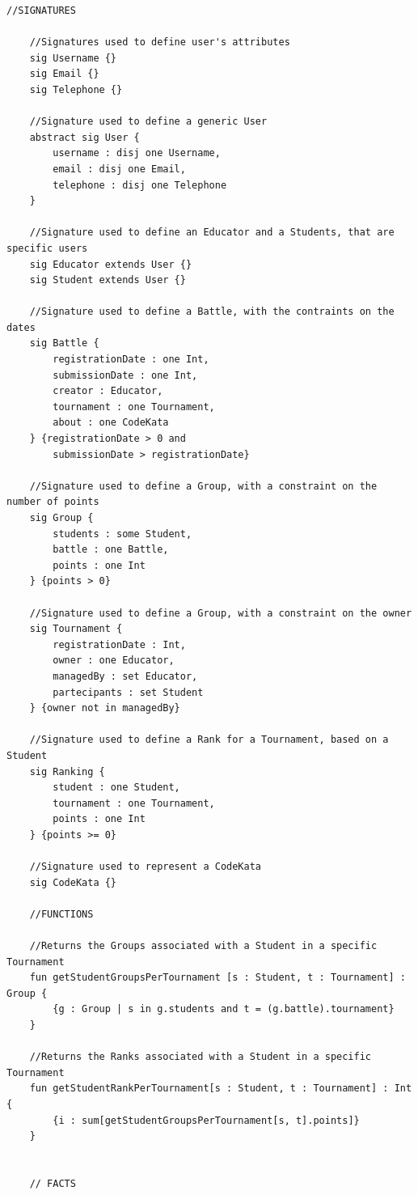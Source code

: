 \documentclass[12pt, a4paper]{report}
\begin{document}
\begin{lstlisting}[language=alloy]
    //SIGNATURES

    //Signatures used to define user's attributes
    sig Username {}
    sig Email {}
    sig Telephone {}
    
    //Signature used to define a generic User
    abstract sig User {
        username : disj one Username,
        email : disj one Email,
        telephone : disj one Telephone
    }
    
    //Signature used to define an Educator and a Students, that are specific users
    sig Educator extends User {}
    sig Student extends User {}
    
    //Signature used to define a Battle, with the contraints on the dates
    sig Battle {
        registrationDate : one Int,
        submissionDate : one Int,
        creator : Educator,
        tournament : one Tournament,
        about : one CodeKata
    } {registrationDate > 0 and 
        submissionDate > registrationDate}
    
    //Signature used to define a Group, with a constraint on the number of points
    sig Group {
        students : some Student,
        battle : one Battle,	
        points : one Int
    } {points > 0}
    
    //Signature used to define a Group, with a constraint on the owner
    sig Tournament {
        registrationDate : Int,
        owner : one Educator,
        managedBy : set Educator,
        partecipants : set Student
    } {owner not in managedBy}
    
    //Signature used to define a Rank for a Tournament, based on a Student
    sig Ranking {
        student : one Student,
        tournament : one Tournament,
        points : one Int
    } {points >= 0}
    
    //Signature used to represent a CodeKata
    sig CodeKata {}
    
    //FUNCTIONS

    //Returns the Groups associated with a Student in a specific Tournament
    fun getStudentGroupsPerTournament [s : Student, t : Tournament] : Group {
        {g : Group | s in g.students and t = (g.battle).tournament}
    }
    
    //Returns the Ranks associated with a Student in a specific Tournament
    fun getStudentRankPerTournament[s : Student, t : Tournament] : Int {
        {i : sum[getStudentGroupsPerTournament[s, t].points]}
    }
    
    
    // FACTS
    

\end{lstlisting}
\end{document}
